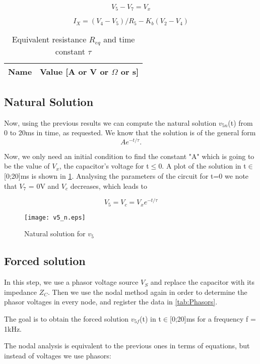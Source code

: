 \begin{equation}
  V_5 - V_7 = V_x
  \label{eq:kvl9}
\end{equation}

\begin{equation}
 I_X = (V_4 - V_5)/R_5 - K_b(V_2 - V_4) 
  \label{eq:kvl10}
\end{equation}


\begin{table}[h]
  \centering
  \begin{tabular}{|l|r|}
    \hline    
    {\bf Name} & {\bf Value [A or V or $\Omega$ or s]} \\ \hline
    
  \end{tabular}
  \caption{Equivalent resistance $R_{eq}$ and time constant $\tau$}
  \label{tab:Req}
\end{table}
\FloatBarrier

\subsection{Natural Solution}

Now, using the previous results we can compute the natural solution $v_{5n}$(t) from 0 to 20ms in time, as requested. We know that the solution is of the general form 
\begin{equation}
Ae^{-t/\tau}.
\label{eq:kvl11}
\end{equation}

Now, we only need an initial condition to find the constant "A" which is going to be the value of $V_x$, the capacitor's voltage for t$\leq$0. A plot of the solution in t$\in$[0;20]ms is shown in \ref{fig:v5_n}. Analysing the parameters of the circuit for t=0 we note that $V_7$ = 0V and $V_c$ decreases, which leads to

\begin{equation}
  V_5 = V_c = V_xe^{-t/\tau} 
  \label{eq:kvl12}
\end{equation}


\begin{figure}[h] \centering
\texttt{[image: v5\_n.eps]}
\caption{Natural solution for $v_5$}
\label{fig:v5_n}
\end{figure}
\FloatBarrier

\subsection{Forced solution}

In this step, we use a phasor voltage source $V_S$ and replace the capacitor with its impedance $Z_C$. Then we use the nodal method again in order to determine the phasor voltages in every node, and register the data in \ref{tab:Phasors}. \par
The goal is to obtain the forced solution $v_{5f}$(t) in t$\in$[0;20]ms for a frequency f = 1kHz. \par
The nodal analysis is equivalent to the previous ones in terms of equations, but instead of voltages we use phasors:

